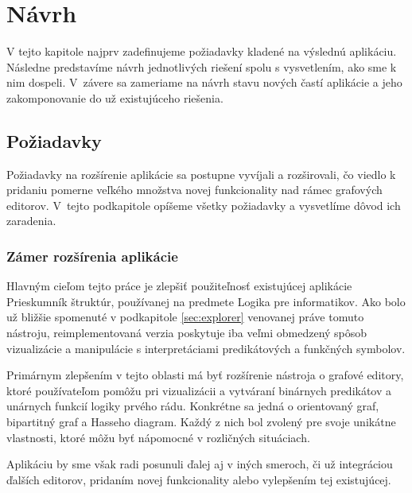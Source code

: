 \chapter{Návrh}
V tejto kapitole najprv zadefinujeme požiadavky kladené na výslednú aplikáciu. Následne predstavíme návrh jednotlivých riešení spolu s vysvetlením, ako sme k nim dospeli. V~závere sa zameriame na návrh stavu nových častí aplikácie a jeho zakomponovanie do už existujúceho riešenia.


\label{kap:navrh} %

\section{Požiadavky}

Požiadavky na rozšírenie aplikácie sa postupne vyvíjali a rozširovali, čo viedlo k pridaniu pomerne veľkého množstva novej funkcionality nad rámec grafových editorov. V~tejto podkapitole opíšeme všetky požiadavky a vysvetlíme dôvod ich zaradenia.

\subsection{Zámer rozšírenia aplikácie}
Hlavným cieľom tejto práce je zlepšiť použiteľnosť existujúcej aplikácie Prieskumník štruktúr, používanej na predmete Logika pre informatikov. Ako bolo už bližšie spomenuté v podkapitole \ref{sec:explorer} venovanej práve tomuto nástroju, reimplementovaná verzia poskytuje iba veľmi obmedzený spôsob vizualizácie a manipulácie s interpretáciami predikátových a funkčných symbolov.

Primárnym zlepšením v tejto oblasti má byť rozšírenie nástroja o grafové editory, ktoré používateľom pomôžu pri vizualizácii a vytváraní binárnych predikátov a unárnych funkcií logiky prvého rádu. Konkrétne sa jedná o orientovaný graf, bipartitný graf a Hasseho diagram. Každý z nich bol zvolený pre svoje unikátne vlastnosti, ktoré môžu byť nápomocné v rozličných situáciach.

Aplikáciu by sme však radi posunuli ďalej aj v iných smeroch, či už integráciou ďalších editorov, pridaním novej funkcionality alebo vylepšením tej existujúcej.

